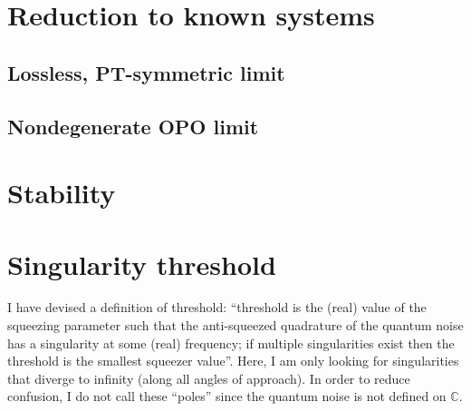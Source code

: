 \section{Reduction to known systems}

\subsection{Lossless, PT-symmetric limit}


\subsection{Nondegenerate OPO limit}


\section{Stability}


\section{Singularity threshold}

I have devised a definition of threshold: ``threshold is the (real) value of the squeezing parameter such that the anti-squeezed quadrature of the quantum noise has a singularity at some (real) frequency; if multiple singularities exist then the threshold is the smallest squeezer value''. Here, I am only looking for singularities that diverge to infinity (along all angles of approach). In order to reduce confusion, I do not call these ``poles'' since the quantum noise is not defined on $\mathbb{C}$. 

